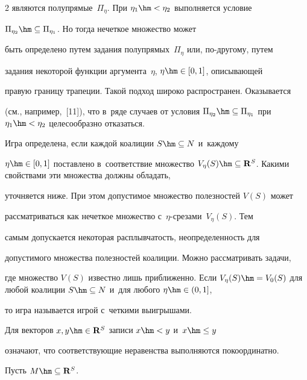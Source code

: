 \begin{multicols}{2}
являются полупрямые~$\Pi_\eta$. При $\eta_1\hm< \eta_2$ выполняется условие 

$\Pi_{\eta_2}\hm\subseteq \Pi_{\eta_1}$. Но тогда нечеткое множество может 

быть определено путем задания полупрямых~$\Pi_\eta$ или, по-другому, путем 

задания некоторой функции аргумента~$\eta$, $\eta\hm\in [0,1]$, описывающей 

правую границу трапеции. Такой подход широко распространен. Оказывается 

(см., например,~[11]), что в~ряде случаев от условия $\Pi_{\eta_2}\hm\subseteq 

\Pi_{\eta_1}$ при $\eta_1\hm<\eta_2$ целесообразно отказаться. 

     

     Игра определена, если каждой коалиции $S\hm\subseteq N$ и~каждому 

$\eta\hm\in [0,1]$ поставлено в~соответствие множество $V_\eta(S)\hm\subseteq 

\mathbf{R}^S$. Какими свойствами эти множества должны обладать, 

уточняется ниже. При этом допустимое множество полезностей $V(S)$ может 

рассматриваться как нечеткое множество с~\mbox{$\eta$-сре}\-за\-ми~$V_\eta(S)$. Тем 

самым допускается некоторая расплывчатость, неопределенность для 

допустимого множества полезностей коалиции. Можно рассматривать задачи, 

где множество $V(S)$ известно лишь приближенно. Если $V_\eta(S)\hm = 

V_0(S)$ для любой коалиции $S\hm\subseteq N$ и~для любого $\eta\hm\in (0,1]$, 

то игра называется игрой с~четкими выигрышами.



\pagebreak

     

     Для векторов $x,y\hm\in \mathbf{R}^S$ записи $x\hm< y$ и~$x\hm\leq y$ 

означают, что соответствующие неравенства выполняются покоординатно. 

Пусть $M\hm\subseteq \mathbf{R}^S$.

     

     \smallskip

     

    \noindent


\end{multicols}
